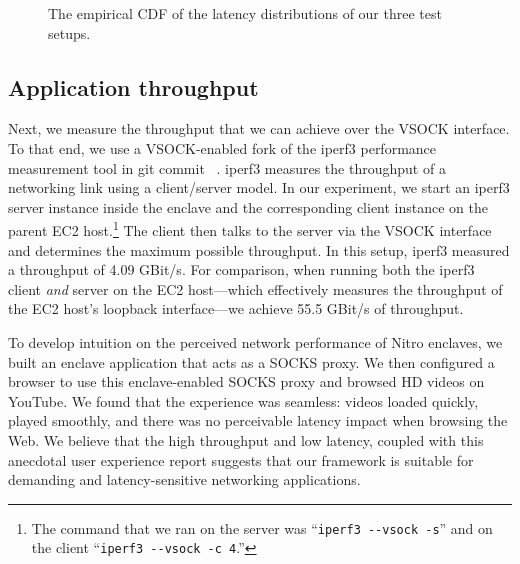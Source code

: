 
\begin{figure}[t]
    \centering
    
    \caption{The empirical CDF of the latency distributions of our three test
      setups.}\label{fig:latency-cdf}
\end{figure}

\subsection{Application throughput}%
\label{sec:throughput}

Next, we measure the throughput that we can achieve over the VSOCK interface.
To that end, we use a VSOCK-enabled fork of the iperf3 performance measurement
tool in git commit ~\cite{iperf-vsock}.  iperf3 measures the throughput of a networking link
using a client/server model.  In our experiment, we start an iperf3 server
instance inside the enclave and the corresponding client instance on the parent
EC2 host.\footnote{The command that we ran on the server was
``\texttt{iperf3 -{}-vsock -s}'' and on the client ``\texttt{iperf3 -{}-vsock -c
4}.''} The client then talks to the server via the VSOCK interface and
determines the maximum possible throughput.  In this setup, iperf3 measured a
throughput of 4.09 GBit/s.  For comparison, when running both the iperf3 client
\emph{and} server on the EC2 host---which effectively measures the
throughput of the EC2 host's loopback interface---we achieve 55.5 GBit/s of
throughput.

To develop intuition on the perceived network performance of Nitro enclaves, we
built an enclave application that acts as a SOCKS proxy.  We then configured a
browser to use this enclave-enabled SOCKS proxy and browsed HD videos on
YouTube.  We found that the experience was seamless: videos loaded quickly,
played smoothly, and there was no perceivable latency impact when browsing the
Web.  We believe that the high throughput and low latency, coupled with this
anecdotal user experience report suggests that our framework is suitable for
demanding and latency-sensitive networking applications.
